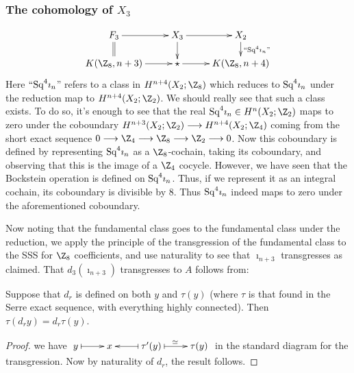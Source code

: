 \documentclass[11pt]{article}
\begin{document}
\subsubsection{\texorpdfstring{The cohomology of $X_3$}{The cohomology of X3}}
\[\xymatrix@R=5mm{
F_3\ar[r]\ar@{=}[d]&
X_3\ar[d]\ar[r]&
X_{2}\ar[d]^{\text{``$\Squ^4\imath_n$''}}\\
K(\Z_8,n+3)\ar[r]&\star\ar[r]&K(\Z_8,n+4)
}\]
Here $``\textup{Sq}^4\imath_n$'' refers to a class in $H^{n+4}(X_2;\Z_8)$ which reduces
to $\textup{Sq}^4\imath_n$ under the reduction map to $H^{n+4}(X_2;\Z_2)$. We should
really see that such a class exists. To do so, it's enough to see that the real
$\Squ^4\imath_n\in H^n(X_2;\Z_2)$ maps to zero under the coboundary
$H^{n+3}(X_2;\Z_2)\to H^{n+4}(X_2;\Z_4)$ coming from the short exact sequence
$0\to \Z_4\to\Z_8\to\Z_2\to0$. Now this coboundary is defined by representing
$\textup{Sq}^4\imath_n$ as a $\Z_8$-cochain, taking its coboundary, and observing that
this is the image of a $\Z_4$ cocycle. However, we have seen that the \THIRD
Bockstein operation is defined on $\textup{Sq}^4\imath_n$. Thus, if we represent it as
an integral cochain, its coboundary is divisible by 8. Thus $\textup{Sq}^4\imath_n$
indeed maps to zero under the aforementioned coboundary.

Now noting that the fundamental class goes to the fundamental class under the
reduction, we apply the principle of the transgression of the fundamental class
to the SSS for $\Z_8$ coefficients, and use naturality to see that
$\imath_{n+3}$ transgresses as claimed. That $d_3(\imath_{n+3})$ transgresses to
$A$ follows from:
\begin{lem*}
Suppose that $d_r$ is defined on both $y$ and $\tau(y)$ (where $\tau$ is that
found in the Serre exact sequence, with everything highly connected). Then
$\tau(d_ry)=d_r\tau(y)$.
\end{lem*}
\begin{proof}
we have 
$\xymatrix{y\ar@{|->}[r]&x&\tau'(y)\ar@{|->}[r]^\simeq\ar@{|->}[l]&\tau(y)}$
in the standard diagram for the transgression. Now by naturality of $d_r$, the
result follows.

\end{proof}
\end{document}
